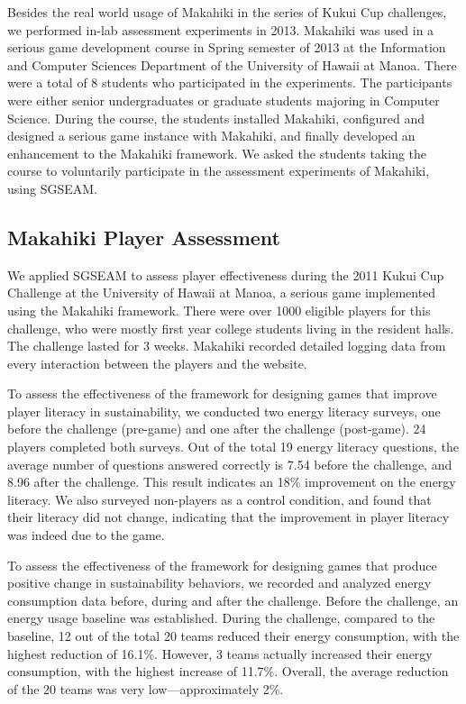 Besides the real world usage of Makahiki in the series of Kukui Cup challenges, we
performed in-lab assessment experiments in 2013. Makahiki was used in a serious game
development course in Spring semester of 2013 at the Information and Computer Sciences
Department of the University of Hawaii at Manoa. There were a total of 8 students who
participated in the experiments.  The participants were either senior undergraduates or
graduate students majoring in Computer Science. During the course, the students installed
Makahiki, configured and designed a serious game instance with Makahiki, and finally
developed an enhancement to the Makahiki framework. We asked the students taking the
course to voluntarily participate in the assessment experiments of Makahiki, using SGSEAM.

\subsection{Makahiki Player Assessment}

We applied SGSEAM to assess player effectiveness during the 2011 Kukui Cup Challenge at
the University of Hawaii at Manoa, a serious game implemented using the Makahiki
framework. There were over 1000 eligible players for this challenge, who were mostly first
year college students living in the resident halls. The challenge lasted for 3 weeks.
Makahiki recorded detailed logging data from every interaction between the players and the
website.

To assess the effectiveness of the framework for designing games that improve player literacy in sustainability, we
conducted two energy literacy surveys, one before the challenge (pre-game) and one after
the challenge (post-game). 24 players completed both surveys. Out of the total 19 energy
literacy questions, the average number of questions answered correctly is 7.54 before the
challenge, and 8.96 after the challenge. This result indicates an 18\% improvement on the
energy literacy.  We also surveyed non-players as a control condition, and found that
their literacy did not change, indicating that the improvement in player literacy was
indeed due to the game.

To assess the effectiveness of the framework for designing games that produce positive change in sustainability
behaviors, we recorded and analyzed energy consumption data before, during and after the
challenge.  Before the challenge, an energy usage baseline was established. During the
challenge, compared to the baseline, 12 out of the total 20 teams reduced their energy
consumption, with the highest reduction of 16.1\%. However, 3 teams actually increased
their energy consumption, with the highest increase of 11.7\%. Overall, the average
reduction of the 20 teams was very low---approximately 2\%.

